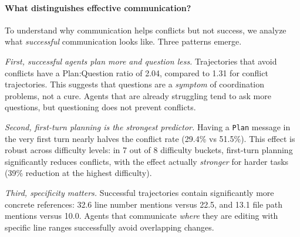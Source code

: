 \paragraph{What distinguishes effective communication?}
To understand why communication helps conflicts but not success, we analyze what \emph{successful} communication looks like. 
Three patterns emerge.


\noindent\textit{First, successful agents plan more and question less.}
Trajectories that avoid conflicts have a Plan:Question ratio of 2.04, compared to 1.31 for conflict trajectories. This suggests that questions are a \emph{symptom} of coordination problems, not a cure. Agents that are already struggling tend to ask more questions, but questioning does not prevent conflicts.

\noindent\textit{Second, first-turn planning is the strongest predictor.}
Having a \texttt{Plan} message in the very first turn nearly halves the conflict rate (29.4\% vs 51.5\%). This effect is robust across difficulty levels: in 7 out of 8 difficulty buckets, first-turn planning significantly reduces conflicts, with the effect actually \emph{stronger} for harder tasks (39\% reduction at the highest difficulty).

\noindent\textit{Third, specificity matters.}
Successful trajectories contain significantly more concrete references: 32.6 line number mentions versus 22.5, and 13.1 file path mentions versus 10.0. Agents that communicate \emph{where} they are editing with specific line ranges successfully avoid overlapping changes.

